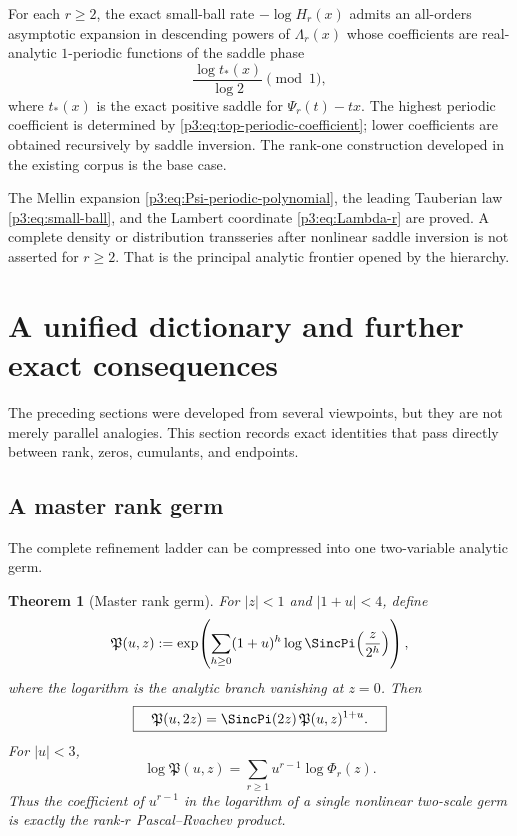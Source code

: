 \documentclass[11pt,oneside]{article}
\newtheorem{theorem}{Theorem}[section]
\theoremstyle{definition}
\theoremstyle{remark}
\begin{document}
\begin{conjecture}\label{p3:conj:full-endpoint}
For each $r\ge2$, the exact small-ball rate $-\log H_r(x)$ admits an all-orders asymptotic expansion in descending powers of $\Lambda_r(x)$ whose coefficients are real-analytic $1$-periodic functions of the saddle phase
\[
  \frac{\log t_*(x)}{\log2}\pmod1,
\]
where $t_*(x)$ is the exact positive saddle for $\Psi_r(t)-tx$.  The highest periodic coefficient is determined by \eqref{p3:eq:top-periodic-coefficient}; lower coefficients are obtained recursively by saddle inversion.  The rank-one construction developed in the existing corpus is the base case.
\end{conjecture}

\begin{cautionbox}
The Mellin expansion \eqref{p3:eq:Psi-periodic-polynomial}, the leading Tauberian law \eqref{p3:eq:small-ball}, and the Lambert coordinate \eqref{p3:eq:Lambda-r} are proved.  A complete density or distribution transseries after nonlinear saddle inversion is not asserted for $r\ge2$.  That is the principal analytic frontier opened by the hierarchy.
\end{cautionbox}


\section{A unified dictionary and further exact consequences}\label{p3:sec:synthesis}

The preceding sections were developed from several viewpoints, but they are not merely parallel analogies.  This section records exact identities that pass directly between rank, zeros, cumulants, and endpoints.

\subsection{A master rank germ}

The complete refinement ladder can be compressed into one two-variable analytic germ.

\begin{theorem}[Master rank germ]\label{p3:thm:master-rank-germ}
For $|z|<1$ and $|1+u|<4$, define
\begin{equation}\label{p3:eq:master-rank-germ}
 \mathfrak P(u,z):=
 \exp\!\left(
   \sum_{h\ge0}(1+u)^h
   \log\SincPi\!\left(\frac z{2^h}\right)
 \right),
\end{equation}
where the logarithm is the analytic branch vanishing at $z=0$.  Then
\begin{equation}\label{p3:eq:master-nonlinear-refinement}
 \boxed{\quad
 \mathfrak P(u,2z)=\SincPi(2z)\,\mathfrak P(u,z)^{1+u}.
 \quad}
\end{equation}
For $|u|<3$,
\begin{equation}\label{p3:eq:master-rank-coefficients}
 \log\mathfrak P(u,z)
 =\sum_{r\ge1}u^{r-1}\log\Phi_r(z).
\end{equation}
Thus the coefficient of $u^{r-1}$ in the logarithm of a single nonlinear two-scale germ is exactly the rank-$r$ Pascal--Rvachev product.
\end{theorem}
\end{document}
